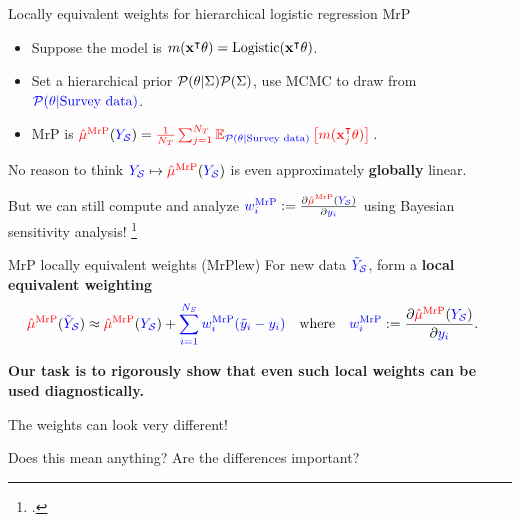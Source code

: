 \begin{frame}[t]{Locally equivalent weights for hierarchical logistic regression MrP}
%
\begin{itemize}
    \item Suppose the model is $\m(\x^\trans \theta) = \mathrm{Logistic}(\x^\trans \theta)$.
    \item Set a hierarchical prior $\p(\theta \vert \Sigma)\p(\Sigma)$,
            use MCMC to draw from $\post$.
    \item MrP is $\muhatmrp = \tarcol{\meantar \expect{\post}{\m(\x_j^\trans \theta)}}$.
\end{itemize}
%
No reason to think $\Ysur \mapsto \muhatmrp$ is even approximately \textbf{globally} linear.

But we can still compute and analyze
$\surcol{\w_i^\mrp} := \frac{\partial \muhatmrp}{\partial \surcol{\y_i}}$
using Bayesian sensitivity analysis!
\footcite{gustafson:1996:localposterior,giordano:2018:covariances}

\pause
\begin{block}{MrP locally equivalent weights (MrPlew)}
\centering
\vspace{1em}
For new data $\Ytil$, form a \textbf{local equivalent weighting}
$$
\begin{aligned}
\muhatmrp[\Ytil] \approx{}& \muhatmrp + \surcol{\sumsur \w_i^\mrp (\ytil_i - \y_i)}\quad
\textrm{where}\quad \surcol{\w_i^\mrp} :={} \frac{\partial \muhatmrp}{\partial \surcol{\y_i}}.
\end{aligned}
$$
\vspace{1em}
\end{block}
%
\pause
\textbf{
Our task is to rigorously show that even such local weights can be used
diagnostically.
}

%


\end{frame}




\begin{frame}{The weights can look very different!}

    \centering
    Does this mean anything?  Are the differences important?

    \AlexanderWeightPlot{}
\end{frame}


